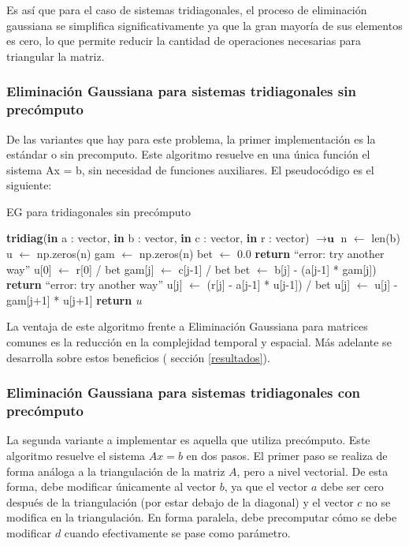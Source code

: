  Es así que para el caso de sistemas tridiagonales, el proceso de eliminación gaussiana se simplifica significativamente ya que la gran mayoría de sus elementos es cero, lo que permite reducir la cantidad de operaciones necesarias para triangular la matriz.

 \subsubsection{Eliminación Gaussiana para sistemas tridiagonales sin precómputo}

 De las variantes que hay para este problema, la primer implementación es la estándar o sin precomputo. Este algoritmo resuelve en una única función el sistema Ax = b, sin necesidad de funciones auxiliares. El pseudocódigo es el siguiente:

 \begin{algorithm}
\caption{EG para tridiagonales sin precómputo}
\begin{algorithmic}
\State \textbf{tridiag}(\textbf{in} a : vector, \textbf{in} b : vector, \textbf{in} c : vector, \textbf{in} r : vector) $\to \textbf{u}$
\State n $\gets$ len(b)
\State u $\gets$ np.zeros(n)
\State gam $\gets$ np.zeros(n)
\State bet $\gets$ 0.0
    \State \textbf{return} ``error: try another way''
\EndIf
\State u[0] $\gets$ r[0] / bet
    \State gam[j] $\gets$ c[j-1] / bet
    \State bet $\gets$ b[j] - (a[j-1] * gam[j])
        \State \textbf{return} ``error: try another way''
    \EndIf
    \State u[j] $\gets$ (r[j] - a[j-1] * u[j-1]) / bet
\EndFor
{}
    \State u[j] $\gets$ u[j] - gam[j+1] * u[j+1]
\EndFor
\State \textbf{return $u$}
\end{algorithmic}
\end{algorithm}

La ventaja de este algoritmo frente a Eliminación Gaussiana para matrices comunes es la reducción en la complejidad temporal y espacial. Más adelante se desarrolla sobre estos beneficios ( sección \ref{resultados}).

\subsubsection{Eliminación Gaussiana para sistemas tridiagonales con precómputo}

La segunda variante a implementar es aquella que utiliza precómputo. Este algoritmo resuelve el sistema $Ax = b$ en dos pasos. 
El primer paso se realiza de forma análoga a la triangulación de la matriz $A$, pero a nivel vectorial. De esta forma, debe modificar únicamente al vector $b$, ya que el vector $a$ debe ser cero después de la triangulación (por estar debajo de la diagonal) y el vector $c$ no se modifica en la triangulación. En forma paralela, debe precomputar cómo se debe modificar $d$ cuando efectivamente se pase como parámetro.

